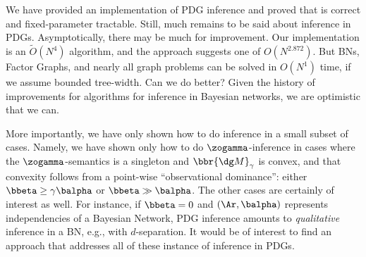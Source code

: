 We have provided an implementation of PDG inference and proved that is correct and fixed-parameter tractable. 
Still, much remains to be said about inference in PDGs. 
Asymptotically, there may be much for improvement. Our implementation
is an $\tilde O(N^4)$ algorithm, and the approach suggests one of
$O(N^{2.872})$.  
 But BNs, Factor Graphs, and nearly all graph problems can be solved
 in $O(N^1)$ time, if we assume bounded tree-width. Can we do better? 
 Given the history of improvements for algorithms for inference in
 Bayesian networks, we are optimistic that we can.
 
More importantly, we have only shown how to do inference in a small
subset of cases.  
Namely, we have shown only how to do
$\zogamma$-inference in cases where the $\zogamma$-semantics is a
singleton and $\bbr{\dg M}_{\gamma}$ is convex,
and that convexity follows from a point-wise ``observational
dominance'': either $\bbeta \ge \gamma \balpha$ or $\bbeta \gg
\balpha$.  
The other cases are certainly of interest as well. For instance, if
$\bbeta = 0$ and $(\Ar, \balpha)$ represents independencies of a
Bayesian Network, PDG inference amounts to \emph{qualitative}
inference in a BN, e.g., with $d$-separation.  
It would be of interest to find
an approach that addresses all of these instance of inference in
PDGs. 
 
